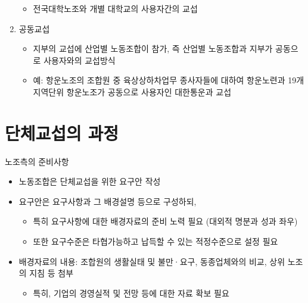 \documentclass[aspectratio=169,xcolor=dvipsnames,handout]{beamer}
\begin{document}
\begin{frame}[allowframebreaks]
\begin{enumerate}[<+->]
\begin{itemize}[<+->]
            \item 전국대학노조와 개별 대학교의 사용자간의 교섭
        \end{itemize}
    \item 공동교섭
        \begin{itemize}[<+->]
            \item 지부의 교섭에 산업별 노동조합이 참가, 즉 산업별 노동조합과 지부가 공동으로 사용자와의 교섭방식
            \item 예: 항운노조의 조합원 중 육상상하차업무 종사자들에 대하여 항운노련과 19개 지역단위 항운노조가 공동으로 사용자인 대한통운과 교섭
        \end{itemize}
    \end{enumerate}
\end{frame}

\section{단체교섭의 과정}

\begin{frame}{노조측의 준비사항}
    \begin{itemize}[<+->]
        \item 노동조합은 단체교섭을 위한 요구안 작성
        \item 요구안은 요구사항과 그 배경설명 등으로 구성하되,
        \begin{itemize}[<+->]
            \item 특히 요구사항에 대한 배경자료의 준비 노력 필요 (대외적 명분과 성과 좌우)
            \item 또한 요구수준은 타협가능하고 납득할 수 있는 적정수준으로 설정 필요
        \end{itemize}
    \item 배경자료의 내용: 조합원의 생활실태 및 불만·요구, 동종업체와의 비교, 상위 노조의 지침 등 첨부
        \begin{itemize}[<+->]
            \item 특히, 기업의 경영실적 및 전망 등에 대한 자료 확보 필요
        \end{itemize}
    \end{itemize}
\end{frame}
\end{document}
